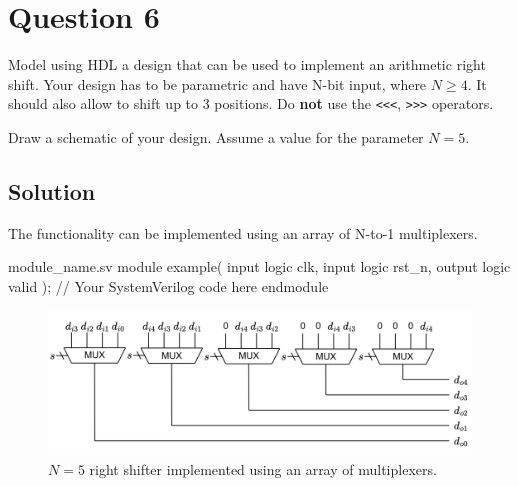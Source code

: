 \documentclass[../main.tex]{subfiles}
\begin{document}
\section{Question 6}

Model using HDL a design that can be used to implement an arithmetic right shift. Your design has to be parametric and have N-bit input, where $N \geq 4$. It should also allow to shift up to 3 positions. Do \textbf{not} use the \texttt{<<<}, \texttt{>>>} operators.

Draw a schematic of your design. Assume a value for the parameter $N = 5$.

\subsection*{Solution}

The functionality can be implemented using an array of N-to-1 multiplexers.

\begin{svminted}{module_name.sv}
module example(
    input  logic clk,
    input  logic rst_n,
    output logic valid
);
    // Your SystemVerilog code here
endmodule
\end{svminted}

\begin{figure}[h]
    \centering
    \includegraphics[width=1.0\linewidth]{assets/q6.png}
    \caption{$N = 5$ right shifter implemented using an array of multiplexers.}
    \label{q6}
\end{figure}
\end{document}
